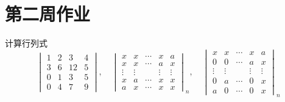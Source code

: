 \section{第二周作业}
\begin{example}{计算行列式}{}
\[\begin{vmatrix}
    1&2&3&4\\
    3&6&12&5\\
    0&1&3&5\\
    0&4&7&9
\end{vmatrix},\quad
\begin{vmatrix}x&x&\cdots&x&a\\x&x&\cdots&a&x\\\vdots&\vdots&&\vdots&\vdots\\x&a&\cdots&x&x\\a&x&\cdots&x&x\end{vmatrix}_n,\quad
\begin{vmatrix}x&x&\cdots&x&a\\0&0&\cdots&a&x\\\vdots&\vdots&&\vdots&\vdots\\0&a&\cdots&0&x\\a&0&\cdots&0&x\end{vmatrix}_n\]
\end{example}
